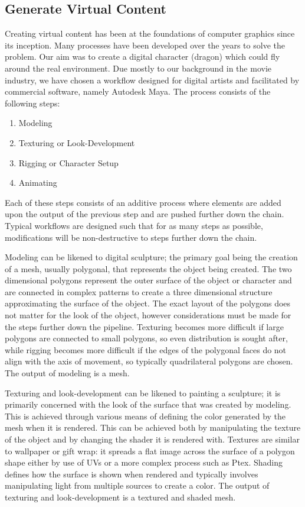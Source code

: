 \subsection{Generate Virtual Content}

Creating virtual content has been at the foundations of computer graphics since its inception. Many processes have been developed over the years to solve the problem. Our aim was to create a digital character (dragon) which could fly around the real environment. Due mostly to our background in the movie industry, we have chosen a workflow designed for digital artists and facilitated by commercial software, namely Autodesk Maya. The process consists of the following steps:

\begin{enumerate}
	\item Modeling 
	\item Texturing or Look-Development
	\item Rigging or Character Setup
	\item Animating
\end{enumerate}

Each of these steps consists of an additive process where elements are added upon the output of the previous step and are pushed further down the chain. Typical workflows are designed such that for as many steps as possible, modifications will be non-destructive to steps further down the chain.

Modeling can be likened to digital sculpture; the primary goal being the creation of a mesh, usually polygonal, that represents the object being created. The two dimensional polygons represent the outer surface of the object or character and are connected in complex patterns to create a three dimensional structure approximating the surface of the object. The exact layout of the polygons does not matter for the look of the object, however considerations must be made for the steps further down the pipeline. Texturing becomes more difficult if large polygons are connected to small polygons, so even distribution is sought after, while rigging becomes more difficult if the edges of the polygonal faces do not align with the axis of movement, so typically quadrilateral polygons are chosen. The output of modeling is a mesh.

Texturing and look-development can be likened to painting a sculpture; it is primarily concerned with the look of the surface that was created by modeling. This is achieved through various means of defining the color generated by the mesh when it is rendered. This can be achieved both by manipulating the texture of the object and by changing the shader it is rendered with. Textures are similar to wallpaper or gift wrap: it spreads a flat image across the surface of a polygon shape either by use of UVs or a more complex process such as Ptex. Shading defines how the surface is shown when rendered and typically involves manipulating light from multiple sources to create a color. The output of texturing and look-development is a textured and shaded mesh. 

